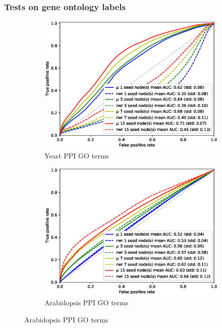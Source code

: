 \documentclass[sigconf]{acmart}
\begin{document}
\subsubsection{Tests on gene ontology labels}
\begin{figure}[t]
     \centering
    \begin{subfigure}[b]{0.31\textwidth}
        \centering
        \includegraphics[width=\textwidth]{images/rocs/yeast_ppi_amigo.eps}
        \caption{Yeast PPI GO terms}
    \end{subfigure}
    \begin{subfigure}[b]{0.31\textwidth}
        \centering
        \includegraphics[width=\textwidth]{images/rocs/arabidopsis_ppi_amigo.eps}
        \caption{Arabidopsis PPI GO terms}

\end{subfigure}
\end{figure}
\end{document}
